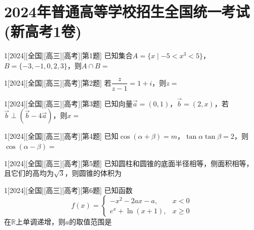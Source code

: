 \section{2024年普通高等学校招生全国统一考试(新高考1卷)}
\begin{example}{1}[2024][全国][高三][高考][第1题]
已知集合$A=\{x\mid -5<x^3<5\}$，$B=\{-3,-1,0,2,3\}$，则$A\cap B=$\blankbox
\begin{choices}
\end{choices}
\end{example}

\begin{example}{1}[2024][全国][高三][高考][第2题]
若$\dfrac{z}{z-1}=1+i$，则$z=$\blankbox
\begin{choices}
\end{choices}
\end{example}

\begin{example}{1}[2024][全国][高三][高考][第3题]
已知向量$\vec{a}=(0,1)$，$\vec{b}=(2,x)$，若$\vec{b}\perp(\vec{b}-4\vec{a})$，则$x=$\blankbox
\begin{choices}
\end{choices}
\end{example}

\begin{example}{1}[2024][全国][高三][高考][第4题]
已知$\cos(\alpha+\beta)=m$，$\tan\alpha\tan\beta=2$，则$\cos(\alpha-\beta)=$\blankbox
\begin{choices}
\end{choices}
\end{example}

\begin{example}{1}[2024][全国][高三][高考][第5题]
已知圆柱和圆锥的底面半径相等，侧面积相等，且它们的高均为$\sqrt{3}$，则圆锥的体积为\blankbox
\begin{choices}
\end{choices}
\end{example}

\begin{example}{1}[2024][全国][高三][高考][第6题]
已知函数
\[
f(x)=
\begin{cases}
-x^2-2ax-a, & x<0\\
e^x+\ln(x+1), & x\ge 0
\end{cases}
\]
在$\mathbb{R}$上单调递增，则$a$的取值范围是\blankbox
\begin{choices}
\choice{$(-\infty,0]$}
\choice{$[-1,0]$}
\choice{$[-1,1]$}
\choice{$[0,+\infty)$}
\end{choices}
\end{example}

